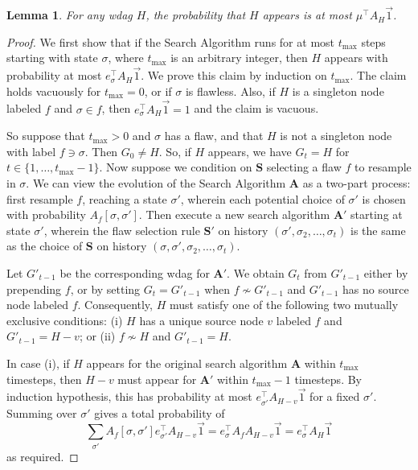\documentclass[11pt]{article}
\newtheorem{lemma}[theorem]{Lemma}
\begin{document}
\begin{lemma}
  \label{witness-tree-lemma_simple}
For any wdag $H$, the probability that $H$ appears is at most $\mu^{\top} A_H \vec 1$.
\end{lemma}

\begin{proof}
We first show that if the Search Algorithm runs for at most $t_{\max}$ steps starting with state $\sigma$, where $t_{\max}$ is an arbitrary integer, then $H$ appears with probability at most $e_{\sigma}^{\top} A_H \vec 1.$ We prove this claim by induction on $t_{\max}$.  The claim holds vacuously for $t_{\max} = 0$, or if $\sigma$ is flawless. Also, if $H$ is a singleton node labeled $f$ and $\sigma \in f$, then $e_{\sigma}^{\top} A_H \vec 1 = 1$ and the claim is vacuous.  

So suppose that $t_{\max} > 0$ and $\sigma$ has a flaw, and that $H$ is not a singleton node with label $f \ni \sigma$.  Then $G_0 \neq H$. So, if $H$ appears,  we have $G_t = H$ for  $t  \in \{1, \dots,  t_{\max} -1 \}$. Now suppose we condition on $\mathbf S$ selecting a flaw $f$ to resample in $\sigma$.  We can view the evolution of the Search Algorithm $\mathbf A$ as a two-part process: first resample $f$, reaching a state $\sigma'$, wherein each potential choice of $\sigma'$ is chosen with probability $A_f[\sigma, \sigma']$. Then execute a new search algorithm $\mathbf A'$ starting at state $\sigma'$, wherein the flaw selection rule $\mathbf S'$ on history $(\sigma', \sigma_2,  \dots, \sigma_t)$ is the same as the choice of $\mathbf S$ on history $(\sigma, \sigma', \sigma_2, \dots, \sigma_t)$.   

 Let $G'_{t-1}$ be the corresponding wdag for $\mathbf A'$. We obtain $G_t$ from $G'_{t-1}$ either by prepending $f$, or by setting $G_t = G'_{t-1}$ when $f \not \sim G'_{t-1}$ and $G'_{t-1}$ has no source node labeled $f$. Consequently, $H$ must satisfy one of the following two mutually exclusive conditions: (i) $H$ has a unique source node $v$ labeled $f$ and $G'_{t-1} = H - v$; or  (ii) $f \not \sim H$ and  $G'_{t-1} = H$.

In case (i), if $H$ appears for the original search algorithm $\mathbf A$ within $t_{\max}$ timesteps, then   $H-v$ must appear for $\mathbf A'$ within $t_{\max}-1$ timesteps. By induction hypothesis, this has  probability at most $e_{\sigma'}^{\top} A_{H-v} \vec 1$ for a fixed $\sigma'$. Summing over $\sigma'$ gives a total probability of 
$$
\sum_{\sigma'} A_f[\sigma, \sigma'] e_{\sigma'}^{\top} A_{H-v} \vec 1 = e_{\sigma}^{\top} A_f  A_{H-v} \vec 1 = e_{\sigma}^{\top} A_H \vec 1
$$
as required.


\end{proof}
\end{document}
